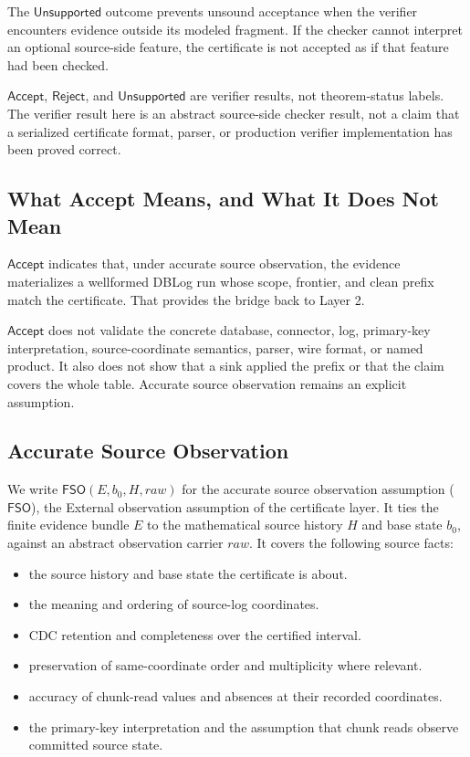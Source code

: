 \documentclass[letterpaper,10pt,twocolumn]{article}
\newcommand{\RawObs}{\mathit{raw}}
\newcommand{\FSO}{\mathsf{FSO}}
\newcommand{\Accept}{\mathsf{Accept}}
\newcommand{\Reject}{\mathsf{Reject}}
\newcommand{\Unsupported}{\mathsf{Unsupported}}
\providecommand{\tightlist}{\setlength{\itemsep}{0pt}\setlength{\parskip}{0pt}}
\begin{document}
The $\Unsupported$ outcome prevents unsound acceptance when the
verifier encounters evidence outside its modeled fragment. If the checker
cannot interpret an optional source-side feature, the certificate is not
accepted as if that feature had been checked.

$\Accept$, $\Reject$, and $\Unsupported$ are verifier
results, not theorem-status labels. The verifier result here is an
abstract source-side checker result, not a claim that a serialized
certificate format, parser, or production verifier implementation has
been proved correct.

\subsection{What Accept Means, and What It Does Not
Mean}\label{what-accept-means-and-what-it-does-not-mean}

$\Accept$ indicates that, under accurate source observation, the
evidence materializes a wellformed DBLog run whose scope, frontier, and
clean prefix match the certificate. That provides the bridge back to
Layer 2.

$\Accept$ does not validate the concrete database, connector, log,
primary-key interpretation, source-coordinate semantics, parser, wire
format, or named product. It also does not show that a sink applied the
prefix or that the claim covers the whole table. Accurate source
observation remains an explicit assumption.

\subsection{Accurate Source
Observation}\label{faithful-source-observation}

We write $\FSO(E,b_0,H,\RawObs)$ for the accurate source observation
assumption ($\FSO$), the External observation assumption of the certificate
layer. It ties the finite evidence bundle $E$ to the mathematical
source history $H$ and base state $b_0$, against an abstract observation
carrier $\RawObs$. It covers the following source facts:

\begin{itemize}\tightlist
\item the source history and base state the certificate is about.
\item the meaning and ordering of source-log coordinates.
\item CDC retention and completeness over the certified interval.
\item preservation of same-coordinate order and multiplicity where
  relevant.
\item accuracy of chunk-read values and absences at their recorded
  coordinates.
\item the primary-key interpretation and the assumption that chunk
  reads observe committed source state.
\end{itemize}
\end{document}
